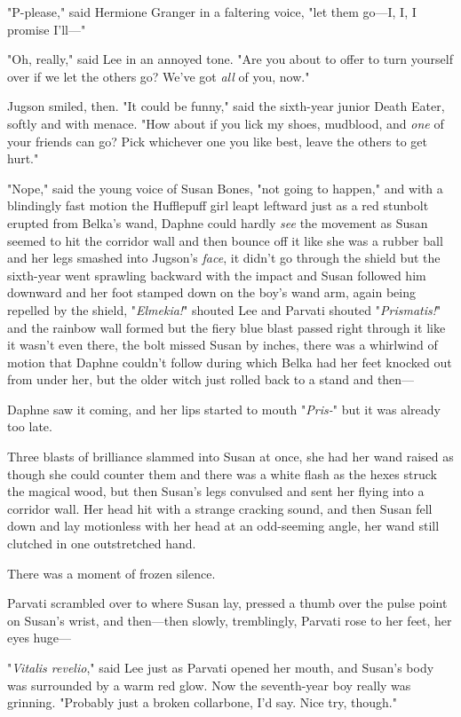 "P-please," said Hermione Granger in a faltering voice, "let them go---I, I, I 
promise I'll---"

"Oh, really," said Lee in an annoyed tone. "Are you about to offer to turn 
yourself over if we let the others go? We've got \emph{all} of you, now."

Jugson smiled, then. "It could be funny," said the sixth-year junior Death 
Eater, softly and with menace. "How about if you lick my shoes, mudblood, and 
\emph{one} of your friends can go? Pick whichever one you like best, leave the 
others to get hurt."

"Nope," said the young voice of Susan Bones, "not going to happen," and with a 
blindingly fast motion the Hufflepuff girl leapt leftward just as a red 
stunbolt erupted from Belka's wand, Daphne could hardly \emph{see} the movement 
as Susan seemed to hit the corridor wall and then bounce off it like she was a 
rubber ball and her legs smashed into Jugson's \emph{face}, it didn't go 
through the shield but the sixth-year went sprawling backward with the impact 
and Susan followed him downward and her foot stamped down on the boy's wand 
arm, again being repelled by the shield, "\emph{Elmekia!}" shouted Lee and 
Parvati shouted "\emph{Prismatis!}" and the rainbow wall formed but the fiery 
blue blast passed right through it like it wasn't even there, the bolt missed 
Susan by inches, there was a whirlwind of motion that Daphne couldn't follow 
during which Belka had her feet knocked out from under her, but the older witch 
just rolled back to a stand and then---

Daphne saw it coming, and her lips started to mouth "\emph{Pris-}" but it was 
already too late.

Three blasts of brilliance slammed into Susan at once, she had her wand raised 
as though she could counter them and there was a white flash as the hexes 
struck the magical wood, but then Susan's legs convulsed and sent her flying 
into a corridor wall. Her head hit with a strange cracking sound, and then 
Susan fell down and lay motionless with her head at an odd-seeming angle, her 
wand still clutched in one outstretched hand.

There was a moment of frozen silence.

Parvati scrambled over to where Susan lay, pressed a thumb over the pulse point 
on Susan's wrist, and then---then slowly, tremblingly, Parvati rose to her 
feet, her eyes huge---

"\emph{Vitalis revelio}," said Lee just as Parvati opened her mouth, and 
Susan's body was surrounded by a warm red glow. Now the seventh-year boy really 
was grinning. "Probably just a broken collarbone, I'd say. Nice try, though."

